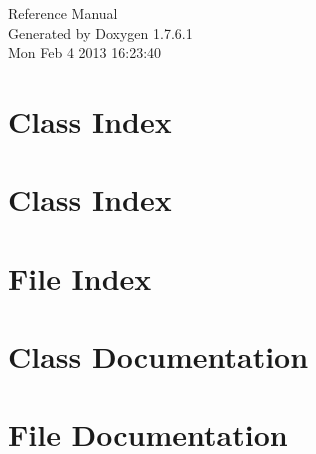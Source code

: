 \documentclass[a4paper]{book}
\begin{document}
\hypersetup{pageanchor=false,citecolor=blue}
\begin{titlepage}
\vspace*{7cm}
\begin{center}
{\Large \-Reference \-Manual}\\
\vspace*{1cm}
{\large \-Generated by Doxygen 1.7.6.1}\\
\vspace*{0.5cm}
{\small Mon Feb 4 2013 16:23:40}\\
\end{center}
\end{titlepage}
\clearemptydoublepage
{}
\tableofcontents
\clearemptydoublepage
{}
\hypersetup{pageanchor=true,citecolor=blue}
\chapter{\-Class \-Index}

\chapter{\-Class \-Index}

\chapter{\-File \-Index}

\chapter{\-Class \-Documentation}






















\chapter{\-File \-Documentation}
































\printindex
\end{document}
